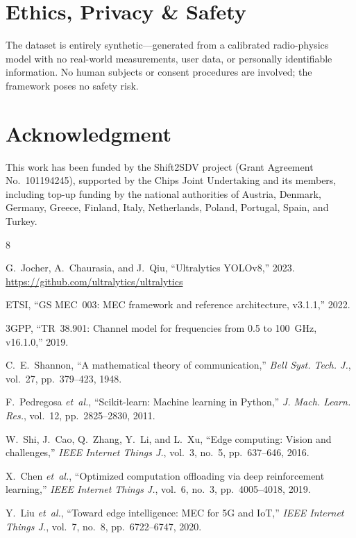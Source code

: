\documentclass[10pt,conference]{IEEEtran}
\begin{document}
\section{Ethics, Privacy \& Safety}

The dataset is entirely synthetic---generated from a calibrated radio-physics
model with no real-world measurements, user data, or personally identifiable
information.  No human subjects or consent procedures are involved; the
framework poses no safety risk.

\section*{Acknowledgment}

This work has been funded by the Shift2SDV project (Grant Agreement
No.~101194245), supported by the Chips Joint Undertaking and its members,
including top-up funding by the national authorities of Austria, Denmark,
Germany, Greece, Finland, Italy, Netherlands, Poland, Portugal, Spain, and
Turkey.

\begin{thebibliography}{8}
\setlength{\itemsep}{0pt plus 0.3pt}

G.~Jocher, A.~Chaurasia, and J.~Qiu,
``Ultralytics YOLOv8,'' 2023.
\url{https://github.com/ultralytics/ultralytics}

ETSI,
``GS MEC~003: MEC framework and reference architecture, v3.1.1,'' 2022.

3GPP,
``TR~38.901: Channel model for frequencies from 0.5 to 100~GHz,
v16.1.0,'' 2019.

C.~E.~Shannon,
``A mathematical theory of communication,''
\textit{Bell Syst. Tech. J.}, vol.~27, pp.~379--423, 1948.


F.~Pedregosa \textit{et~al.},
``Scikit-learn: Machine learning in Python,''
\textit{J. Mach. Learn. Res.}, vol.~12, pp.~2825--2830, 2011.

W.~Shi, J.~Cao, Q.~Zhang, Y.~Li, and L.~Xu,
``Edge computing: Vision and challenges,''
\textit{IEEE Internet Things J.}, vol.~3, no.~5, pp.~637--646, 2016.

X.~Chen \textit{et~al.},
``Optimized computation offloading via deep reinforcement learning,''
\textit{IEEE Internet Things J.}, vol.~6, no.~3, pp.~4005--4018, 2019.

Y.~Liu \textit{et~al.},
``Toward edge intelligence: MEC for 5G and IoT,''
\textit{IEEE Internet Things J.}, vol.~7, no.~8, pp.~6722--6747, 2020.

\end{thebibliography}
\end{document}

